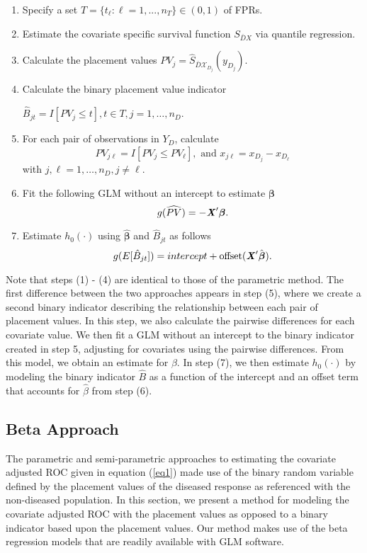 \documentclass{interact}
\theoremstyle{definition}
\newcommand{\X}{\textbf{\textit{X}}}
\begin{document}
	\begin{enumerate}
	\item Specify a set $T = \{t_{\ell}: \ell = 1, ..., n_T\} \in (0,1)$ of FPRs.

		\item Estimate the covariate specific survival function $S_{\bar{D}{X}}$ via quantile regression.
		
	\item Calculate the placement values $PV_j = \hat{S}_{\bar{D} \mathcal{X}_{D_j}} (y_{D_j}).$ 
	
	
	\item Calculate the binary placement value indicator 
	\begin{center}$\hat{B}_{jt} = I[PV_j \leq t], t \in T, j = 1,\ldots, n_D.$ \end{center}

	\item For each pair of observations in $Y_D$, calculate 
	$$ \widehat{PV}_{j \ell} = I[PV_j \leq PV_{\ell}], \text{ and } x_{j \ell} = x_{D_j} - x_{D_\ell}$$ with $j, \ell = 1,\ldots, n_D, j \neq \ell.$
	\item Fit the following GLM without an intercept to estimate $\boldsymbol{\beta}$
$$g(\widehat{PV}) = -\X'\boldsymbol{\beta}. $$ 
\item Estimate $h_0(\cdot)$ using $\hat{\boldsymbol{\beta}}$ and $\hat{B}_{jt}$ as follows
$$ g(E[\hat{B}_{jt}]) = intercept + \text{offset}(\X'\hat{\boldsymbol{\beta}}).$$

	\end{enumerate}


Note that steps (1) - (4) are identical to those of the parametric method.  The first difference between the two approaches appears in step (5), where we create a second binary indicator describing the relationship between each pair of placement values.  In this step, we also calculate the pairwise differences for each covariate value.  We then fit a GLM without an intercept to the binary indicator created in step 5, adjusting for covariates using the pairwise differences.  From this model, we obtain an estimate for $\beta.$  In step (7), we then estimate $h_0(\cdot)$ by modeling the binary indicator $\hat{B}$ as a function of the intercept and an offset term that accounts for $\hat{\beta}$ from step (6).


\subsection{Beta Approach}
The parametric and semi-parametric approaches to estimating the covariate adjusted ROC given in equation (\ref{eq1}) made use of the binary random variable defined by the placement values of the diseased response as referenced with the non-diseased population. In this section, we present a method for modeling the covariate adjusted ROC with the placement values as opposed to a binary indicator based upon the placement values. Our method makes use of the beta regression models that are readily available with GLM software.
\end{document}
